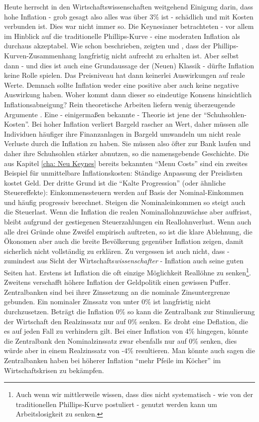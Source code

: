 Heute herrscht in den Wirtschaftswissenschaften weitgehend Einigung darin, dass hohe Inflation - grob gesagt also alles was über 3\% ist -  schädlich und mit Kosten verbunden ist. Dies war nicht immer so. Die Keynesianer betrachteten - vor allem im Hinblick auf die traditionelle Phillips-Kurve - eine moderaten Inflation als durchaus akzeptabel. Wie schon beschrieben, zeigten \textcite{Phelps1968} und \textcite{Friedman1968}, dass der Phillips-Kurven-Zusammenhang langfristig nicht aufrecht zu erhalten ist. Aber selbst dann - und dies ist auch eine Grundaussage der  (Neuen) Klassik -  dürfte Inflation keine Rolle spielen. Das Preisniveau hat dann keinerlei Auswirkungen auf reale Werte. Demnach sollte Inflation weder eine positive aber auch keine negative Auswirkung haben. Woher kommt dann dieser so eindeutige Konsens hinsichtlich Inflationsabneigung? Rein theoretische Arbeiten liefern wenig überzeugende Argumente \parencite[S. 589]{Romer2018}. Eine - einigermaßen bekannte - Theorie ist jene der "`Schuhsohlen-Kosten"'. Bei hoher Inflation verliert Bargeld rascher an Wert, daher müssen alle Individuen häufiger ihre Finanzanlagen in Bargeld umwandeln um nicht reale Verluste durch die Inflation zu haben. Sie müssen also öfter zur Bank laufen und daher ihre Schuhsohlen stärker abnutzen, so die namensgebende Geschichte. Die aus Kapitel \ref{cha: Neu Keynes} bereits bekannten "`Menu Costs"' sind ein zweites Beispiel für unmittelbare Inflationskosten: Ständige Anpassung der Preislisten kostet Geld. Der dritte Grund ist die "`Kalte Progression"' (oder ähnliche Steuereffekte): Einkommenssteuern werden auf Basis der Nominal-Einkommen und häufig progressiv berechnet. Steigen die Nominaleinkommen so steigt auch die Steuerlast. Wenn die Inflation die realen Nominallohnzuwächse aber auffrisst, bleibt aufgrund der gestiegenen Steuerzahlungen ein Reallohnverlust. Wenn auch alle drei Gründe ohne Zweifel empirisch auftreten, so ist die klare Ablehnung, die Ökonomen aber auch die breite Bevölkerung gegenüber Inflation zeigen, damit sicherlich nicht vollständig zu erklären. Zu vergessen ist auch nicht, dass - zumindest aus Sicht der Wirtschafts\textit{wissenschafter} - Inflation auch seine guten Seiten hat. Erstens ist Inflation die oft einzige Möglichkeit Reallöhne zu senken\footnote{Auch wenn wir mittlerweile wissen, dass dies nicht systematisch - wie von der traditionellen Phillips-Kurve postuliert - genutzt werden kann um Arbeitslosigkeit zu senken.}. Zweitens verschafft höhere Inflation der Geldpolitik einen gewissen Puffer. Zentralbanken sind bei ihrer Zinssetzung an die nominale Zinsuntergrenze gebunden. Ein nominaler Zinssatz von unter 0\% ist langfristig nicht durchzusetzen. Beträgt die Inflation 0\% so kann die Zentralbank zur Stimulierung der Wirtschaft den Realzinssatz nur auf 0\% senken. Es droht eine Deflation, die es auf jeden Fall zu verhindern gilt. Bei einer Inflation von 4\% hingegen, könnte die Zentralbank den Nominalzinssatz zwar ebenfalls nur auf 0\% senken, dies würde aber in einem Realzinssatz von -4\% resultieren. Man könnte auch sagen die Zentralbanken haben bei höherer Inflation "`mehr Pfeile im Köcher"' im Wirtschaftskrisen zu bekämpfen.

